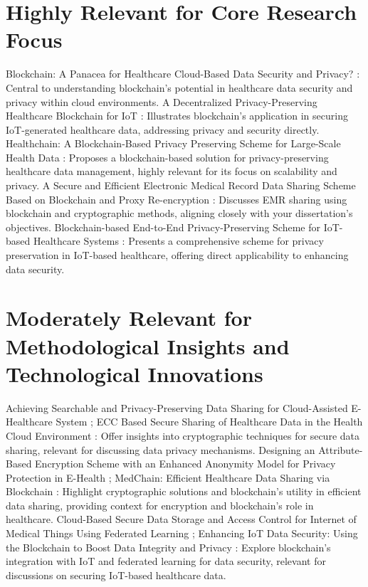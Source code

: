 \documentclass[cic,tc,english]{iiufrgs}
\begin{document}
\section{Highly Relevant for Core Research Focus}

    Blockchain: A Panacea for Healthcare Cloud-Based Data Security and Privacy? \cite{Esposito2018}: Central to understanding blockchain's potential in healthcare data security and privacy within cloud environments.
    A Decentralized Privacy-Preserving Healthcare Blockchain for IoT \cite{Dwivedi2019}: Illustrates blockchain's application in securing IoT-generated healthcare data, addressing privacy and security directly.
    Healthchain: A Blockchain-Based Privacy Preserving Scheme for Large-Scale Health Data \cite{XuJie2019}: Proposes a blockchain-based solution for privacy-preserving healthcare data management, highly relevant for its focus on scalability and privacy.
    A Secure and Efficient Electronic Medical Record Data Sharing Scheme Based on Blockchain and Proxy Re-encryption \cite{Liu2024}: Discusses EMR sharing using blockchain and cryptographic methods, aligning closely with your dissertation’s objectives.
    Blockchain-based End-to-End Privacy-Preserving Scheme for IoT-based Healthcare Systems \cite{maryam2024}: Presents a comprehensive scheme for privacy preservation in IoT-based healthcare, offering direct applicability to enhancing data security.

\section{Moderately Relevant for Methodological Insights and Technological Innovations}

    Achieving Searchable and Privacy-Preserving Data Sharing for Cloud-Assisted E-Healthcare System \cite{XuChang2019}; ECC Based Secure Sharing of Healthcare Data in the Health Cloud Environment \cite{sri2019}: Offer insights into cryptographic techniques for secure data sharing, relevant for discussing data privacy mechanisms.
    Designing an Attribute-Based Encryption Scheme with an Enhanced Anonymity Model for Privacy Protection in E-Health \cite{Zala2024}; MedChain: Efficient Healthcare Data Sharing via Blockchain \cite{Shen2019}: Highlight cryptographic solutions and blockchain’s utility in efficient data sharing, providing context for encryption and blockchain's role in healthcare.
    Cloud-Based Secure Data Storage and Access Control for Internet of Medical Things Using Federated Learning \cite{Bhansali2022}; Enhancing IoT Data Security: Using the Blockchain to Boost Data Integrity and Privacy \cite{Eghmazi2024}: Explore blockchain's integration with IoT and federated learning for data security, relevant for discussions on securing IoT-based healthcare data.
\end{document}

